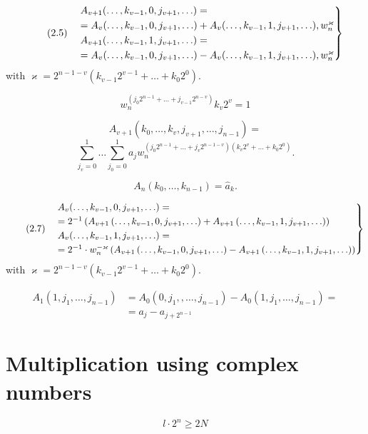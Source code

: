 \documentclass{article}
\begin{document}
\[
\tag{2.5}
\begin{rcases}
& A_{v + 1}(\ldots, k_{v -1}, 0, j_{v + 1}, \ldots) = \\
&= A_v(\ldots, k_{v - 1}, 0, j_{v + 1}, \ldots) + A_v (\ldots, k_{v - 1}, 1, j_{v + 1}, \ldots), w_n^\varkappa \\
& A_{v + 1}(\ldots, k_{v -1}, 1, j_{v + 1}, \ldots) = \\
&= A_v(\ldots, k_{v - 1}, 0, j_{v + 1}, \ldots) - A_v (\ldots, k_{v - 1}, 1, j_{v + 1}, \ldots), w_n^\varkappa \\
\end{rcases}
\]
with $\varkappa = 2^{n - 1 - v} (k_{v - 1} 2^{v - 1} + \ldots + k_0 2^0)$.

\[
w_n^{\left(j_0 2^{n - 1} + \ldots + j_{v - 1} 2^{n - v}\right)} k_v 2^v = 1
\]

\[
A_{v + 1} \left(k_0, \ldots, k_v, j_{v + 1}, \ldots, j_{n - 1}\right) =
\]
\[
\sum_{j_v = 0}^1 \ldots \sum_{j_0 = 0}^1 a_j w_n^{\left(j_0 2^{n - 1} + \ldots + j_v 2^{n - 1 - v}\right)\left(k_v 2^v + \ldots + k_0 2^0\right)}.
\]

\[
\tag{2.6}
A_n (k_0, \ldots, k_{n - 1}) = \hat{a}_k.
\]

\[
\tag{2.7}
\begin{rcases}
&A_v(\ldots, k_{v - 1}, 0, j_{v + 1}, \ldots) = \\
&= 2^{-1} \left(A_{v + 1}\left(\ldots, k_{v - 1}, 0, j_{v + 1}, \ldots\right) + A_{v + 1}\left(\ldots, k_{v - 1}, 1, j_{v + 1}, \ldots\right)\right) \\
&A_v(\ldots, k_{v - 1}, 1, j_{v + 1}, \ldots) = \\
&= 2^{-1} \cdot w_n^{-\varkappa} \left(A_{v + 1}\left(\ldots, k_{v - 1}, 0, j_{v + 1}, \ldots\right) - A_{v + 1}\left(\ldots, k_{v - 1}, 1, j_{v + 1}, \ldots\right)\right) \\
\end{rcases}
\] with $\varkappa = 2^{n - 1 - v}(k_{v - 1} 2^{v - 1} + \ldots + k_0 2^0)$.

\begin{align*}
\tag{2.8}
A_1(1, j_1, \ldots, j_{n - 1}) &= A_0(0, j_1,, \ldots, j_{n - 1}) - A_0(1, j_1, \ldots, j_{n - 1})  = \\
&= a_j - a_{j + 2^{n - 1}}
\end{align*}

\section{Multiplication using complex numbers}
\[
\tag{3.1}
l \cdot 2^n \ge 2N
\]
\end{document}
